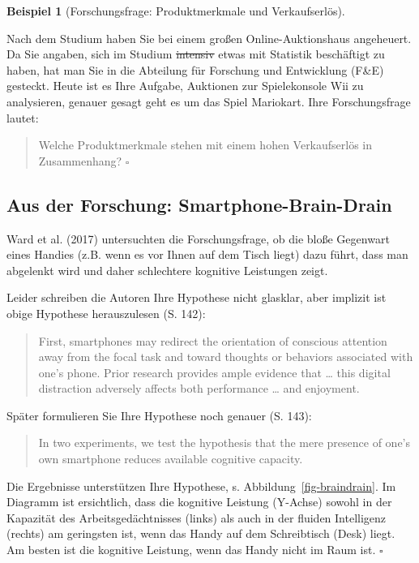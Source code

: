 \documentclass[
  letterpaper,
  oneside,
  open=any]{scrbook}
\theoremstyle{definition}
\theoremstyle{definition}
\newtheorem{example}{Beispiel}[chapter]
\theoremstyle{definition}
\theoremstyle{remark}
\begin{document}
\begin{example}[Forschungsfrage: Produktmerkmale und
Verkaufserlös]\protect\hypertarget{exm-fofrage2}{}\label{exm-fofrage2}

Nach dem Studium haben Sie bei einem großen Online-Auktionshaus
angeheuert. Da Sie angaben, sich im Studium \st{intensiv} etwas mit
Statistik beschäftigt zu haben, hat man Sie in die Abteilung für
Forschung und Entwicklung (F\&E) gesteckt. Heute ist es Ihre Aufgabe,
Auktionen zur Spielekonsole Wii zu analysieren, genauer gesagt geht es
um das Spiel Mariokart. Ihre Forschungsfrage lautet:

\begin{quote}
Welche Produktmerkmale stehen mit einem hohen Verkaufserlös in
Zusammenhang? \(\square\)
\end{quote}

\end{example}

\subsection{Aus der Forschung:
Smartphone-Brain-Drain}\label{aus-der-forschung-smartphone-brain-drain-1}

Ward et al. (2017) untersuchten die Forschungsfrage, ob die bloße
Gegenwart eines Handies (z.B. wenn es vor Ihnen auf dem Tisch liegt)
dazu führt, dass man abgelenkt wird und daher schlechtere kognitive
Leistungen zeigt.

Leider schreiben die Autoren Ihre Hypothese nicht glasklar, aber
implizit ist obige Hypothese herauszulesen (S. 142):

\begin{quote}
First, smartphones may redirect the orientation of conscious attention
away from the focal task and toward thoughts or behaviors associated
with one's phone. Prior research provides ample evidence that \ldots{}
this digital distraction adversely affects both performance \ldots{} and
enjoyment.
\end{quote}

Später formulieren Sie Ihre Hypothese noch genauer (S. 143):

\begin{quote}
In two experiments, we test the hypothesis that the mere presence of
one's own smartphone reduces available cognitive capacity.
\end{quote}

Die Ergebnisse unterstützen Ihre Hypothese, s.
Abbildung~\ref{fig-braindrain}. Im Diagramm ist ersichtlich, dass die
kognitive Leistung (Y-Achse) sowohl in der Kapazität des
Arbeitsgedächtnisses (links) als auch in der fluiden Intelligenz
(rechts) am geringsten ist, wenn das Handy auf dem Schreibtisch (Desk)
liegt. Am besten ist die kognitive Leistung, wenn das Handy nicht im
Raum ist. \(\square\)
\end{document}
